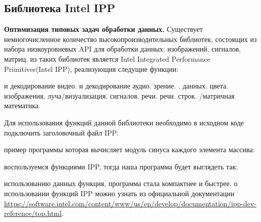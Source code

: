 { %
	\subsection{Библиотека Intel IPP}
	\label{IPP:section}
	\par\textbf{Оптимизация типовых задач обработки данных.} Существует немногочисленное количество высокопроизводительных библиотек, состоящих из набора низкоуровневых API для обработки данных: изображений, сигналов, матриц.
	 из таких библиотек является Intel Integrated Performance Primitives(Intel IPP), реализующия следущие функции:
	\begin{itemize}
		 и декодирование видео.
		 и декодирование аудио.
		 зрение.
		.
		 данных.
		 цвета.
		 изображения.
		 луча/визуализация.
		 сигналов.
		 речи.
		 речи.
		 строк.
		/матричная математика.
	\end{itemize}
	Для использования функций данной библиотеки необходимо в исходном коде подключить заголовочный файл IPP:
	\begin{figure}[H]
		
	\end{figure}
	 пример программы которая вычисляет модуль синуса каждого элемента массива:
	\begin{figure}[H]
		
	\end{figure}
	 воспользуемся функциями IPP, тогда наша программа будет выглядеть так:
	\begin{figure}[H]
		
	\end{figure}
     использованию данных функция, программа стала компактнее и быстрее.
     о использовании функций IPP можно узнать из официальной документации \url{https://software.intel.com/content/www/us/en/develop/documentation/ipp-dev-reference/top.html}.
    \par
}
